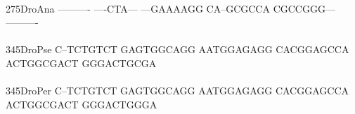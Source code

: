 \documentclass[11pt,twoside,reqno,a4paper]{article}
\begin{document}
{\hspace*{4\charwidth}\hspace*{7\charwidth}\hspace*{1\charwidth}\hspace*{1\charwidth}\hspace*{1\charwidth}\hspace*{1\charwidth}\hspace*{1\charwidth}\hspace*{1\charwidth}\\
275\hspace*{1\charwidth}DroAna	----------	----CTA---	---GAAAAGG	CA--GCGCCA	CGCCGGG---	----------	\\
\hspace*{4\charwidth}\hspace*{7\charwidth}\hspace*{1\charwidth}\hspace*{1\charwidth}\hspace*{1\charwidth}\hspace*{1\charwidth}\hspace*{1\charwidth}\hspace*{1\charwidth}\\
345\hspace*{1\charwidth}DroPse	C--TCTGTCT	GAGTGGCAGG	AATGGAGAGG	CACGGAGCCA	ACTGGCGACT	GGGACTGCGA	\\
\hspace*{4\charwidth}\hspace*{7\charwidth}\hspace*{1\charwidth}\hspace*{1\charwidth}\hspace*{1\charwidth}\hspace*{1\charwidth}\hspace*{1\charwidth}\hspace*{1\charwidth}\\
345\hspace*{1\charwidth}DroPer	C--TCTGTCT	GAGTGGCAGG	AATGGAGAGG	CACGGAGCCA	ACTGGCGACT	GGGACTGGGA	\\
\hspace*{4\charwidth}\hspace*{7\charwidth}\hspace*{1\charwidth}\hspace*{1\charwidth}\hspace*{1\charwidth}\hspace*{1\charwidth}\hspace*{1\charwidth}\hspace*{1\charwidth}\\
}
\end{document}
